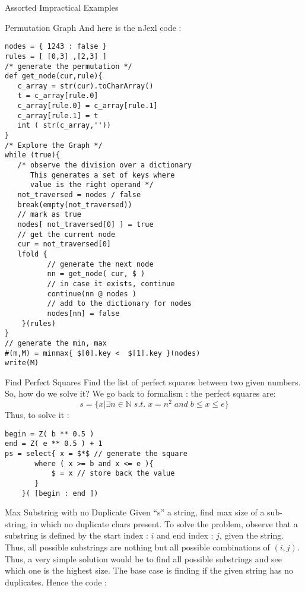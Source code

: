 \begin{section}{Assorted Impractical Examples}
\begin{subsection}{Permutation Graph}
And here is the nJexl code :
\begin{center}\begin{minipage}{\linewidth}
\begin{lstlisting}[style=JexlStyle]
nodes = { 1243 : false }
rules = [ [0,3] ,[2,3] ] 
/* generate the permutation */
def get_node(cur,rule){
   c_array = str(cur).toCharArray()
   t = c_array[rule.0]
   c_array[rule.0] = c_array[rule.1]
   c_array[rule.1] = t 
   int ( str(c_array,'')) 
}
/* Explore the Graph */
while (true){
   /* observe the division over a dictionary 
      This generates a set of keys where 
      value is the right operand */
   not_traversed = nodes / false 
   break(empty(not_traversed)) 
   // mark as true 
   nodes[ not_traversed[0] ] = true
   // get the current node 
   cur = not_traversed[0] 
   lfold {
          // generate the next node 
          nn = get_node( cur, $ )
          // in case it exists, continue 
          continue(nn @ nodes )
          // add to the dictionary for nodes 
          nodes[nn] = false 
    }(rules)
}
// generate the min, max 
#(m,M) = minmax{ $[0].key <  $[1].key }(nodes)
write(M)
\end{lstlisting}  
\end{minipage}\end{center}
\end{subsection}

\begin{subsection}{Find Perfect Squares}
Find the list of perfect squares between two given numbers.
So, how do we solve it? We go back to formalism : the perfect squares are:
$$
s = \{ x | \exists n \in \mathbb{N} \; s.t.\; x = n^2  \; and \;  b \le x \le e  \} 
$$
Thus, to solve it :
\begin{center}\begin{minipage}{\linewidth}
\begin{lstlisting}[style=JexlStyle]
begin = Z( b ** 0.5 )
end = Z( e ** 0.5 ) + 1 
ps = select{ x = $*$ // generate the square 
       where ( x >= b and x <= e ){
           $ = x // store back the value    
       } 
    }( [begin : end ])
\end{lstlisting}  
\end{minipage}\end{center}
\end{subsection}

\begin{subsection}{Max Substring with no Duplicate}
Given ``s'' a string, find max size of a sub-string, 
in which no duplicate chars present. To solve the problem,
observe that a substring is defined by the start index : $i$ 
and end index : $j$, given the string. 
Thus, all possible substrings are nothing but all possible combinations of $(i,j)$.
Thus, a very simple solution would be to find all possible substrings and 
see which one is the highest size. 
The base case is finding if the given 
string has no duplicates. Hence the code :


\end{subsection}
\end{section}
